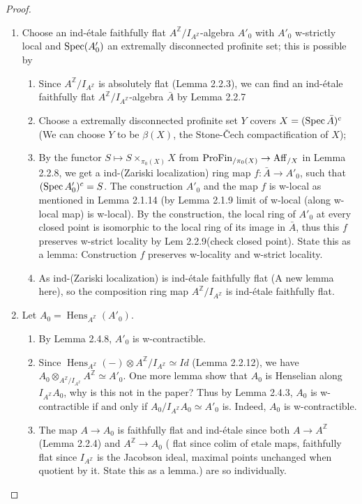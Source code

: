 \begin{proof}
\begin{enumerate}
\item Choose an ind-\'etale faithfully flat $A^{\mathbb{Z}}/I_{A^{\mathbb{Z}}}$-algebra $A'_0$ with $A'_0$ w-strictly local and $\operatorname{Spec}(A'_0)$ an extremally disconnected profinite set; this is possible by
    \begin{enumerate}
    \item Since $A^{\mathbb{Z}}/I_{A^{\mathbb{Z}}}$ is absolutely flat (Lemma 2.2.3), we can find an ind-\'etale faithfully flat $A^{\mathbb{Z}}/I_{A^{\mathbb{Z}}}$-algebra \(\bar{A}\) by Lemma 2.2.7
    \item Choose a extremally disconnected profinite set $Y$ covers \(X = (\operatorname{Spec} \bar{A})^c\) (We can choose \(Y\) to be \(\beta(X)\), the Stone-\v{C}ech compactification of \(X\));
    \item By the functor \(S \mapsto S\times_{\pi_0(X)} X\) from \(\operatorname{ProFin}_{/\pi_0(X)} \to \operatorname{Aff}_{/X}\) in Lemma 2.2.8, we get a ind-(Zariski localization) ring map \(f: \bar{A} \to A'_0 \), such that \((\operatorname{Spec} A'_0)^c = S\). The construction \(A'_0\) and the map \(f\) is w-local as mentioned in Lemma 2.1.14 (by Lemma 2.1.9 limit of w-local (along w-local map) is w-local). By the construction, the local ring of \(A'_0\) at every closed point is isomorphic to the local ring of its image in \(\bar{A}\), thus this \(f\) preserves w-strict locality by Lem 2.2.9(check closed point). {\color{red} State this as a lemma: Construction \(f\) preserves w-locality and w-strict locality.}
    \item As ind-(Zariski localization) is ind-\'etale faithfully flat (A new lemma here), so the composition ring map $A^{\mathbb{Z}}/I_{A^{\mathbb{Z}}}$ is ind-\'etale faithfully flat.
    \end{enumerate}

\item Let $A_0 = \operatorname{Hens}_{A^{\mathbb{Z}}}(A'_0)$. 
    \begin{enumerate}
    \item By Lemma 2.4.8, $A'_0$ is w-contractible.
    \item Since \(\operatorname{Hens}_{A^{\mathbb{Z}}}(-) \otimes A^{\mathbb{Z}}/I_{A^{\mathbb{Z}}} \simeq Id \) (Lemma 2.2.12), we have \(A_0 \otimes_{A^{\mathbb{Z}}/I_{A^{\mathbb{Z}}}} A^{\mathbb{Z}} \simeq A'_0\).
    {\color{red} One more lemma show that \(A_0\) is Henselian along \(I_{A^{\mathbb{Z}}} A_0\), why is this not in the paper?} Thus by Lemma 2.4.3, $A_0$ is w-contractible if and only if $ A_0 / I_{A^{\mathbb{Z}}} A_0 \simeq A'_0 $ is. Indeed, $A_0$ is w-contractible.
    \item The map $A \to A_0$ is faithfully flat and ind-\'etale since both $A \to A^{\mathbb{Z}}$ (Lemma 2.2.4) and $A^{\mathbb{Z}} \to A_0$ ({\color{red} flat since colim of etale maps, faithfully flat since \(I_{A^{\mathbb{Z}}} \) is the Jacobson ideal, maximal points unchanged when quotient by it. State this as a lemma.}) are so individually.
    \end{enumerate}

\end{enumerate}


\end{proof}

